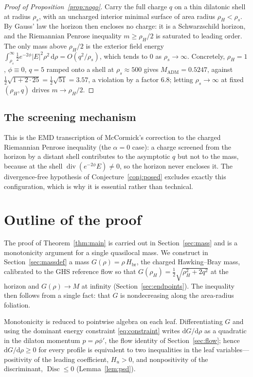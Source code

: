 \documentclass[11pt]{article}
\theoremstyle{plain}
\theoremstyle{definition}
\newcommand{\dd}{\mathrm{d}}
\newcommand{\rH}{\rho_{\!H}}
\newcommand{\Hbr}{H_{\mathrm{br}}}
\newcommand{\Disc}{\operatorname{Disc}}
\begin{document}
\begin{proof}[Proof of Proposition~\ref{prop:nogo}]
Carry the full charge $q$ on a thin dilatonic shell at radius $\rho_s$, with an uncharged interior minimal
surface of area radius $\rH<\rho_s$. By Gauss' law the horizon then encloses no charge: it is a Schwarzschild
horizon, and the Riemannian Penrose inequality $m\ge\rH/2$ \cite{HuiskenIlmanen,Bray} is saturated to leading
order. The only mass above $\rH/2$ is the exterior field energy $\int_{\rho_s}^{\infty}\tfrac12
e^{-2\phi}|E|^2\rho^2\,\dd\rho=O(q^2/\rho_s)$, which tends to $0$ as $\rho_s\to\infty$. Concretely,
$\rH=1$, $\phi\equiv0$, $q=5$ ramped onto a shell at $\rho_s\approx500$ gives $M_{\mathrm{ADM}}=0.5247$,
against $\tfrac12\sqrt{1+2\cdot25}=\tfrac12\sqrt{51}=3.57$, a violation by a factor $6.8$; letting
$\rho_s\to\infty$ at fixed $(\rH,q)$ drives $m\to\rH/2$.
\end{proof}

\subsection{The screening mechanism}\label{sec:mechanism}

This is the EMD transcription of McCormick's correction \cite{McCormick} to the charged Riemannian Penrose
inequality (the $\alpha=0$ case): a charge screened from the horizon by a distant shell contributes to the
asymptotic $q$ but not to the mass, because at the shell $\operatorname{div}(e^{-2\phi}E)\neq0$, so the
horizon never encloses it. The divergence-free hypothesis of Conjecture~\ref{conj:posed} excludes exactly this
configuration, which is why it is essential rather than technical.

\section{Outline of the proof}\label{sec:outline}

The proof of Theorem~\ref{thm:main} is carried out in Section~\ref{sec:mass} and is a monotonicity
argument for a single quasilocal mass. We construct in Section~\ref{sec:massdef} a mass $G(\rho)=\rho\,\Hbr$, the
charged Hawking--Bray mass, calibrated to the GHS reference flow so that $G(\rH)=\tfrac12\sqrt{\rH^2+2q^2}$ at
the horizon and $G(\rho)\to M$ at infinity (Section~\ref{sec:endpoints}). The inequality then follows from a
single fact: that $G$ is nondecreasing along the area-radius foliation.

Monotonicity is reduced to pointwise algebra on each leaf. Differentiating $G$ and using the dominant energy
constraint \eqref{eq:constraint} writes $\dd G/\dd\rho$ as a quadratic in the dilaton momentum $p=\rho\phi'$,
the flow identity of Section~\ref{sec:flow}; hence $\dd G/\dd\rho\ge0$ for every profile is equivalent to two
inequalities in the leaf variables---positivity of the leading coefficient, $H_u>0$, and nonpositivity of the
discriminant, $\Disc\le0$ (Lemma~\ref{lem:psd}).
\end{document}

